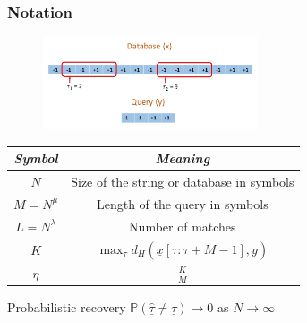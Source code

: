 \documentclass[10pt,xcolor=table]{beamer}
\newcommand{\mbb}{\mathbb}
\newcommand{\xv}{\underline{x}}
\newcommand{\yv}{\underline{y}}
\begin{document}
\begin{frame}\frametitle{Notation}

	\begin{figure}[t]
		\centering
		\includegraphics[width=2.5in]{Pattern_matching_ex.jpg}
	\end{figure}
	\vspace{-8pt}
	{\small
	\begin{table}[h!]
		\label{Table:Notations3}
		\begin{center}
			\begin{tabular}{|c|c|} 	
				\hline		
				\textit{Symbol}		&  \textit{Meaning} \\		
				\hline
				$N$           		& Size of the string or database in symbols \\
				\hline
				$M = N^{\mu}$       & Length of the query in symbols \\
				\hline
				$L = N^\lambda$    &   Number of matches \\
				\hline
				$K$             &$\max_{\tau}d_{H}(\xv[\tau:\tau+M-1],\yv)$\\
				\hline
				$\eta$             &$\frac{K}{M}$\\
				\hline
			\end{tabular}
		\end{center}
	\end{table}
    }
    \begin{block}{Probabilistic recovery}
    $\mbb{P}(\hat{\underline{\tau}} \neq \underline{\tau}) \rightarrow 0$ as $N \rightarrow \infty$
    \end{block}
	\end{frame}	
\end{document}
